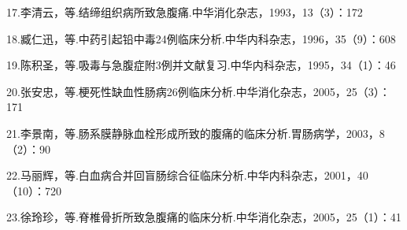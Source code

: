 17.李清云，等.结缔组织病所致急腹痛.中华消化杂志，1993，13（3）：172

18.臧仁迅，等.中药引起铅中毒24例临床分析.中华内科杂志，1996，35（9）：608

19.陈积圣，等.吸毒与急腹症附3例并文献复习.中华内科杂志，1995，34（1）：46

20.张安忠，等.梗死性缺血性肠病26例临床分析.中华消化杂志，2005，25（3）：171

21.李景南，等.肠系膜静脉血栓形成所致的腹痛的临床分析.胃肠病学，2003，8（2）：90

22.马丽辉，等.白血病合并回盲肠综合征临床分析.中华内科杂志，2001，40（10）：720

23.徐玲珍，等.脊椎骨折所致急腹痛的临床分析.中华消化杂志，2005，25（1）：41

\protect\hypertarget{text00202.html}{}{}

